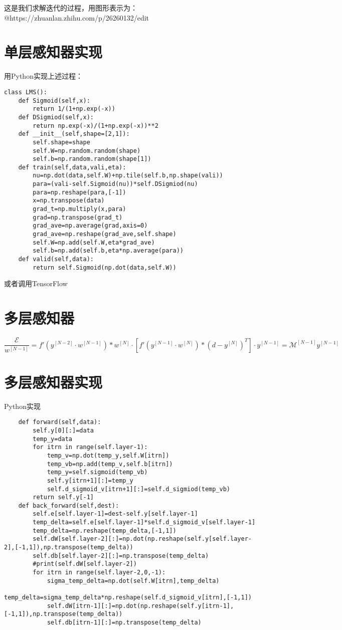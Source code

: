 \documentclass[UTF8]{article}
\begin{document}
这是我们求解迭代的过程，用图形表示为：
@https://zhuanlan.zhihu.com/p/26260132/edit

\section{单层感知器实现}
用Python实现上述过程：
\begin{lstlisting}
class LMS():
    def Sigmoid(self,x):
        return 1/(1+np.exp(-x))
    def DSigmiod(self,x):
        return np.exp(-x)/(1+np.exp(-x))**2
    def __init__(self,shape=[2,1]):
        self.shape=shape
        self.W=np.random.random(shape)
        self.b=np.random.random(shape[1])
    def train(self,data,vali,eta):
        nu=np.dot(data,self.W)+np.tile(self.b,np.shape(vali))
        para=(vali-self.Sigmoid(nu))*self.DSigmiod(nu)
        para=np.reshape(para,[-1])
        x=np.transpose(data)
        grad_t=np.multiply(x,para)
        grad=np.transpose(grad_t)
        grad_ave=np.average(grad,axis=0)
        grad_ave=np.reshape(grad_ave,self.shape)
        self.W=np.add(self.W,eta*grad_ave)
        self.b=np.add(self.b,eta*np.average(para))
    def valid(self,data):
        return self.Sigmoid(np.dot(data,self.W))
\end{lstlisting}
或者调用TensorFlow
\section{多层感知器}

\begin{equation}
\frac{\mathcal{E}}{w^{[N-1]}}=
f'({y^{[N-2]}}\cdot w^{[N-1]}) * 
w^{[N]}\cdot [f'({y^{[N-1]}}\cdot w^{[N]}) *(d-y^{[N]})^T] \cdot y^{[N-1]}
=
\mathcal{M}^{[N-1]} y^{[N-1]}
\end{equation}

\section{多层感知器实现}
Python实现
\begin{lstlisting}
    def forward(self,data):
        self.y[0][:]=data
        temp_y=data
        for itrn in range(self.layer-1):
            temp_v=np.dot(temp_y,self.W[itrn])
            temp_vb=np.add(temp_v,self.b[itrn])
            temp_y=self.sigmoid(temp_vb)
            self.y[itrn+1][:]=temp_y
            self.d_sigmoid_v[itrn+1][:]=self.d_sigmiod(temp_vb)
        return self.y[-1]
    def back_forward(self,dest):
        self.e[self.layer-1]=dest-self.y[self.layer-1]
        temp_delta=self.e[self.layer-1]*self.d_sigmoid_v[self.layer-1]
        temp_delta=np.reshape(temp_delta,[-1,1])
        self.dW[self.layer-2][:]=np.dot(np.reshape(self.y[self.layer-2],[-1,1]),np.transpose(temp_delta))
        self.db[self.layer-2][:]=np.transpose(temp_delta)
        #print(self.dW[self.layer-2])
        for itrn in range(self.layer-2,0,-1):
            sigma_temp_delta=np.dot(self.W[itrn],temp_delta)
            temp_delta=sigma_temp_delta*np.reshape(self.d_sigmoid_v[itrn],[-1,1])
            self.dW[itrn-1][:]=np.dot(np.reshape(self.y[itrn-1],[-1,1]),np.transpose(temp_delta))
            self.db[itrn-1][:]=np.transpose(temp_delta)
\end{lstlisting}
\end{document}
